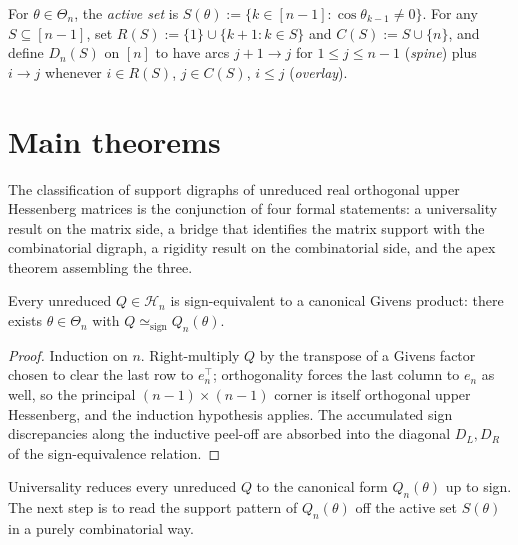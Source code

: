 \begin{definition}\label{def:active}
  \leanok
  For $\theta \in \Theta_n$, the \emph{active set} is
  $S(\theta) := \{ k \in [n-1] : \cos\theta_{k-1} \ne 0\}$.
  For any $S \subseteq [n-1]$, set
  $R(S) := \{1\} \cup \{k+1 : k \in S\}$ and $C(S) := S \cup \{n\}$,
  and define $D_n(S)$ on $[n]$ to have arcs $j+1 \to j$ for
  $1 \le j \le n-1$ (\emph{spine}) plus $i \to j$ whenever
  $i \in R(S)$, $j \in C(S)$, $i \le j$ (\emph{overlay}).
\end{definition}

\chapter{Main theorems}

The classification of support digraphs of unreduced real orthogonal
upper Hessenberg matrices is the conjunction of four formal statements:
a universality result on the matrix side, a bridge that identifies the
matrix support with the combinatorial digraph, a rigidity result on the
combinatorial side, and the apex theorem assembling the three.

\begin{theorem}[Universality]\label{thm:univ}
  \leanok
  Every unreduced $Q \in \mathcal H_n$ is sign-equivalent to a canonical
  Givens product: there exists $\theta \in \Theta_n$ with
  $Q \simeq_{\mathrm{sign}} Q_n(\theta)$.
\end{theorem}
\begin{proof}\leanok{}
  Induction on $n$. Right-multiply $Q$ by the transpose of a Givens
  factor chosen to clear the last row to $e_n^\top$; orthogonality
  forces the last column to $e_n$ as well, so the principal
  $(n{-}1) \times (n{-}1)$ corner is itself orthogonal upper Hessenberg,
  and the induction hypothesis applies. The accumulated sign
  discrepancies along the inductive peel-off are absorbed into the
  diagonal $D_L, D_R$ of the sign-equivalence relation.
\end{proof}

Universality reduces every unreduced $Q$ to the canonical form
$Q_n(\theta)$ up to sign. The next step is to read the support pattern
of $Q_n(\theta)$ off the active set $S(\theta)$ in a purely
combinatorial way.

